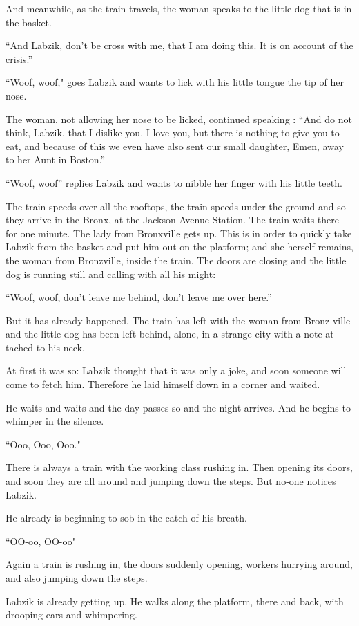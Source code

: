 \documentclass{memoir}
\begin{document}
\begin{pairs}
\begin{Leftside}
\begin{english}
And meanwhile, as the train travels, the woman speaks to the little dog that is in the basket. 

``And Labzik, don't be cross with me, that I am doing this. It is on account of the crisis.''

``Woof, woof," goes Labzik and wants to lick with his little tongue the tip of her nose.

The woman, not allowing her nose to be licked, continued speaking :
``And do not think, Labzik, that I dislike you. I love you, but there is nothing to give you to eat, and
because of this we even have also sent our small daughter, Emen, away to her Aunt in Boston.''    

``Woof, woof'' replies Labzik and wants to nibble her finger with his little teeth.

The train speeds over all the rooftops, the train speeds under the ground and so 
they arrive in the Bronx, at the Jackson Avenue Station. The train waits there
for one minute. The lady from Bronxville gets up. This is in order to quickly take
Labzik from the basket and put him out on the platform; and she herself remains, the woman
from Bronzville, inside the train. The doors are closing and the little dog is running
still and calling with all his might:

``Woof, woof, don't leave me behind, don't leave me over here.'' 

But it has already happened. The train has left with the woman from 
Bronz-ville and the little dog has been left behind, alone, in a strange city 
with a note attached to his neck.

At first it was so: Labzik thought that it was only a joke, and soon someone will
come to fetch him. Therefore he laid himself down in a corner and waited.

He waits and waits and the day passes so and the night arrives. And he begins to whimper
in the silence.

``Ooo, Ooo, Ooo."

There is always a train with the working class rushing in. Then opening its doors,
and soon they are all around and jumping down the steps. But no-one notices Labzik.

He already is beginning to sob in the catch of his breath. 

``OO-oo, OO-oo"

Again a train is rushing in, the doors suddenly opening, workers hurrying around,
and also jumping down the steps.

Labzik is already getting up. He walks along the platform, there and back, with 
drooping ears and whimpering.


\end{english}
\end{Leftside}
\end{pairs}
\end{document}
